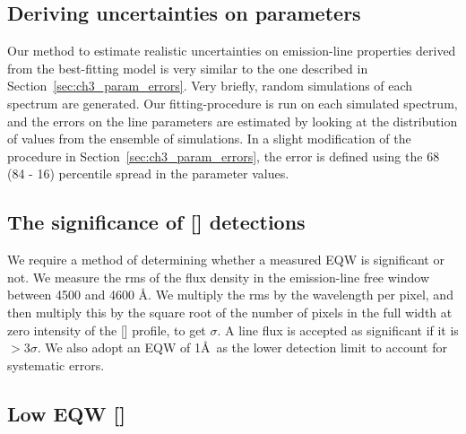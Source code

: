 \subsection{Deriving uncertainties on parameters}

Our method to estimate realistic uncertainties on emission-line properties derived from the best-fitting model is very similar to the one described in Section~\ref{sec:ch3_param_errors}. 
Very briefly, random simulations of each spectrum are generated.
Our fitting-procedure is run on each simulated spectrum, and the errors on the line parameters are estimated by looking at the distribution of values from the ensemble of simulations. 
In a slight modification of the procedure in Section~\ref{sec:ch3_param_errors}, the error is defined using the 68 (84 - 16) percentile spread in the parameter values. 

\subsection{The significance of [] detections}

We require a method of determining whether a measured EQW is significant or not. 
We measure the rms of the flux density in the emission-line free window between 4500 and 4600 \AA. 
We multiply the rms by the wavelength per pixel, and then multiply this by the square root of the number of pixels in the full width at zero intensity of the [] profile, to get $\sigma$. 
A line flux is accepted as significant if it is $>3\sigma$. 
We also adopt an EQW of 1\AA\, as the lower detection limit to account for systematic errors. 

\subsection{Low EQW []}

